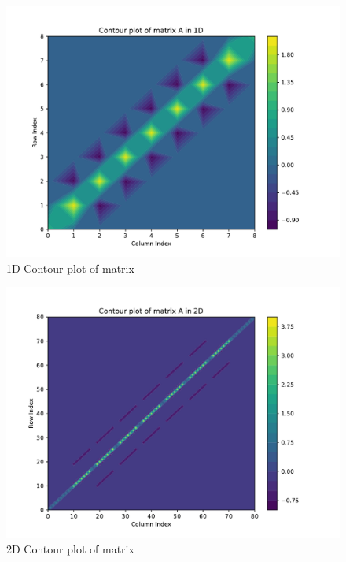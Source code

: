 \begin{figure}[h!]
\includegraphics[width=\textwidth]{contour_plot1D.pdf}
\caption{1D Contour plot of matrix}
\label{fig:contour1D}
\end{figure}

\begin{figure}[h!]
\includegraphics[width=\textwidth]{contour_plot2D.pdf}
\caption{2D Contour plot of matrix}
\label{fig:contour1D}
\end{figure}

